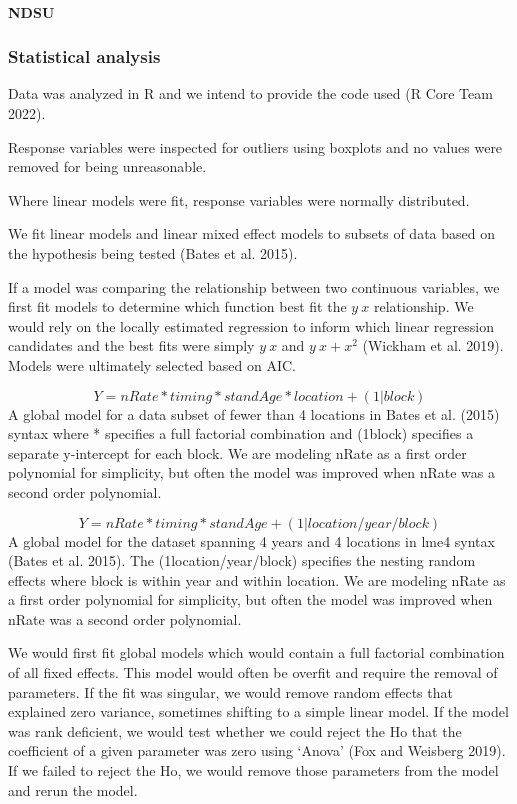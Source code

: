 \documentclass[
  letterpaper,
  DIV=11,
  numbers=noendperiod]{scrartcl}
\let\oldparagraph\paragraph
\renewcommand{\paragraph}[1]{\oldparagraph{#1}\mbox{}}
\begin{document}
\hypertarget{ndsu}{%
\paragraph{NDSU}\label{ndsu}}

\hypertarget{statistical-analysis}{%
\subsubsection{Statistical analysis}\label{statistical-analysis}}

Data was analyzed in R and we intend to provide the code used (R Core
Team 2022).

Response variables were inspected for outliers using boxplots and no
values were removed for being unreasonable.

Where linear models were fit, response variables were normally
distributed.

We fit linear models and linear mixed effect models to subsets of data
based on the hypothesis being tested (Bates et al. 2015).

If a model was comparing the relationship between two continuous
variables, we first fit models to determine which function best fit the
\(y~x\) relationship. We would rely on the locally estimated regression
to inform which linear regression candidates and the best fits were
simply \(y~x\) and \(y~x+x^2\) (Wickham et al. 2019). Models were
ultimately selected based on AIC.

\[ 
Y = nRate * timing * standAge * location + (1|block)
\] A global model for a data subset of fewer than 4 locations in Bates
et al. (2015) syntax where * specifies a full factorial combination and
(1\textbar block) specifies a separate y-intercept for each block. We
are modeling nRate as a first order polynomial for simplicity, but often
the model was improved when nRate was a second order polynomial.

\[
Y = nRate * timing * standAge + (1|location/year/block)
\] A global model for the dataset spanning 4 years and 4 locations in
lme4 syntax (Bates et al. 2015). The (1\textbar location/year/block)
specifies the nesting random effects where block is within year and
within location. We are modeling nRate as a first order polynomial for
simplicity, but often the model was improved when nRate was a second
order polynomial.

We would first fit global models which would contain a full factorial
combination of all fixed effects. This model would often be overfit and
require the removal of parameters. If the fit was singular, we would
remove random effects that explained zero variance, sometimes shifting
to a simple linear model. If the model was rank deficient, we would test
whether we could reject the Ho that the coefficient of a given parameter
was zero using `Anova' (Fox and Weisberg 2019). If we failed to reject
the Ho, we would remove those parameters from the model and rerun the
model.
\end{document}
